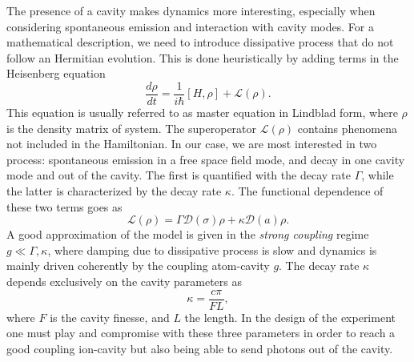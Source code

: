 The presence of a cavity makes dynamics more interesting, especially when considering spontaneous emission and interaction with cavity modes. For a mathematical description, we need to introduce dissipative process that do not follow an Hermitian evolution. This is done heuristically by adding terms in the Heisenberg equation
\begin{equation}
\label{masterequation}
\frac{d\rho}{dt} = \frac{1}{i\hbar}[H,\rho] + \mathcal{L}(\rho).
\end{equation}
This equation is usually referred to as master equation in Lindblad form, where $\rho$ is the density matrix of system. The superoperator
$\mathcal{L}(\rho)$ contains phenomena not included in the Hamiltonian. In our case, we are most interested in two process: spontaneous emission in a free space field mode, and decay in one cavity mode and out of the cavity. The first is quantified with the decay rate $\Gamma$, while the latter is characterized by the decay rate $\kappa$. The functional dependence of these two terms goes as \cite{steck}
\begin{equation}
\mathcal{L}(\rho) = \Gamma\mathcal{D}(\sigma)\rho + \kappa \mathcal{D}(a)\rho.
\end{equation}
A good approximation of the model is given in the \emph{strong coupling} regime $g\ll \Gamma,\kappa$, where damping due to dissipative process is slow and dynamics is mainly driven coherently by the coupling atom-cavity $g$. The decay rate $\kappa$ depends exclusively on the cavity parameters as \cite{helene}
\begin{equation}
\kappa =\frac{c\pi}{FL},
\end{equation}
where $F$ is the cavity finesse, and $L$ the length. In the design of the experiment one must play and compromise with these three parameters in order to reach a good coupling ion-cavity but also being able to send photons out of the cavity.


